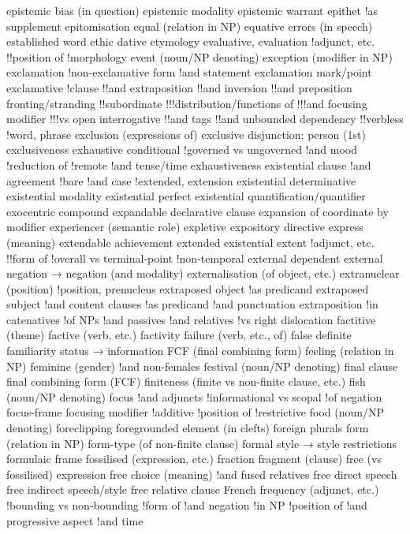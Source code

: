 epistemic bias (in question)
epistemic modality
epistemic warrant
epithet
!as supplement
epitomisation
equal (relation in NP)
equative
errors (in speech)
established word
ethic dative
etymology
evaluative, evaluation
!adjunct, etc.
!!position of
!morphology
event (noun/NP denoting)
exception (modifier in NP)
exclamation
!non-exclamative form
!and statement
exclamation mark/point
exclamative
!clause
!!and extraposition
!!and inversion
!!and preposition fronting/stranding
!!subordinate
!!!distribution/functions of
!!!and focusing modifier
!!!vs open interrogative
!!and tags
!!and unbounded dependency
!!verbless
!word, phrase
exclusion (expressions of)
exclusive disjunction; person (1st)
exclusiveness
exhaustive conditional
!governed vs ungoverned
!and mood
!reduction of
!remote
!and tense/time
exhaustiveness
existential clause
!and agreement
!bare
!and case
!extended, extension
existential determinative
existential modality
existential perfect
existential quantification/quantifier
exocentric compound
expandable declarative clause
expansion of coordinate by modifier
experiencer (semantic role)
expletive
expository directive
express (meaning)
extendable achievement
extended existential
extent
!adjunct, etc.
!!form of
!overall vs terminal-point
!non-temporal
external dependent
external negation → negation (and modality)
externalisation (of object, etc.)
extranuclear (position)
!position, prenucleus
extraposed object
!as predicand
extraposed subject
!and content clauses
!as predicand
!and punctuation
extraposition
!in catenatives
!of NPs
!and passives
!and relatives
!vs right dislocation
factitive (theme)
factive (verb, etc.) factivity
failure (verb, etc., of)
false definite
familiarity status → information
FCF (final combining form)
feeling (relation in NP)
feminine (gender)
!and non-females
festival (noun/NP denoting)
final clause
final combining form (FCF)
finiteness (finite vs non-finite clause, etc.)
fish (noun/NP denoting)
focus
!and adjuncts
!informational vs scopal
!of negation
focus-frame
focusing modifier
!additive
!position of
!restrictive
food (noun/NP denoting)
foreclipping
foregrounded element (in clefts)
foreign plurals
form (relation in NP)
form-type (of non-finite clause)
formal style → style restrictions
formulaic frame
fossilised (expression, etc.)
fraction
fragment (clause)
free (vs fossilised) expression
free choice (meaning)
!and fused relatives
free direct speech
free indirect speech/style
free relative clause
French
frequency (adjunct, etc.)
!bounding vs non-bounding
!form of
!and negation
!in NP
!position of
!and progressive aspect
!and time
